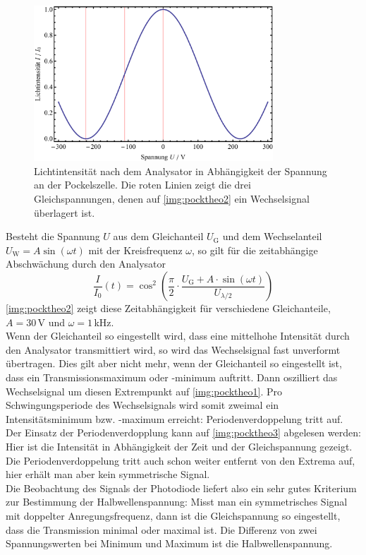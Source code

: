 \begin{figure}[H]
\begin{center}
  \includegraphics[width=0.8\textwidth]{../img/Pocktheo1.pdf}
  \caption{Lichtintensität nach dem Analysator in Abhängigkeit der Spannung an der Pockelszelle.
  Die roten Linien zeigt die drei Gleichspannungen, denen auf \autoref{img:pocktheo2} ein Wechselsignal
  überlagert ist.}
  \label{img:pocktheo1}
\end{center}
\end{figure}

Besteht die Spannung $U$ aus dem Gleichanteil $U_\text{G}$ und dem Wechselanteil
\mbox{$U_\text{W}=A\sin(\omega t)$}
mit der Kreisfrequenz $\omega$,
so gilt für die zeitabhängige Abschwächung durch den Analysator
\begin{equation}
\label{eq:intt}
  \frac{I}{I_0}(t)=\cos^2(\frac{\pi}{2} \cdot \frac{U_\text{G} + A\cdot\sin(\omega t)}{U_{\lambda / 2}})
\end{equation}
\autoref{img:pocktheo2} zeigt diese Zeitabhängigkeit für verschiedene Gleichanteile,
\mbox{$A=30$\,V} und $\omega=1$\,kHz.\\
Wenn der Gleichanteil so eingestellt wird,
dass eine mittelhohe Intensität durch den Analysator transmittiert wird,
so wird das Wechselsignal fast unverformt übertragen.
Dies gilt aber nicht mehr, wenn der Gleichanteil so eingestellt ist,
dass ein Transmissionsmaximum oder -minimum auftritt.
Dann oszilliert das Wechselsignal um diesen Extrempunkt auf \autoref{img:pocktheo1}.
Pro Schwingungsperiode des Wechselsignals wird somit zweimal ein Intensitätsminimum bzw. -maximum erreicht:
Periodenverdoppelung tritt auf.\\
Der Einsatz der Periodenverdopplung kann auf \autoref{img:pocktheo3} abgelesen werden:
Hier ist die Intensität in Abhängigkeit der Zeit und der Gleichspannung gezeigt.
Die Periodenverdoppelung tritt auch schon weiter entfernt von den Extrema auf,
hier erhält man aber kein symmetrische Signal.\\
Die Beobachtung des Signals der Photodiode liefert also ein sehr gutes Kriterium zur
Bestimmung der Halbwellenspannung:
Misst man ein symmetrisches Signal mit doppelter Anregungsfrequenz,
dann ist die Gleichspannung so eingestellt,
dass die Transmission minimal oder maximal ist.
Die Differenz von zwei Spannungswerten bei Minimum und Maximum ist die Halbwellenspannung.


